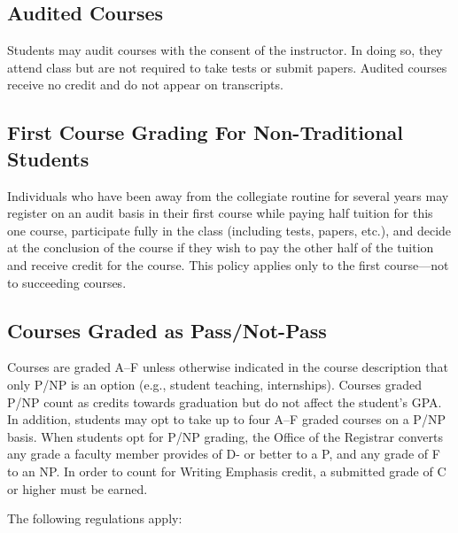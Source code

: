 \documentclass[
  letterpaper,
]{scrbook}
\begin{document}
\subsection{Audited Courses}\label{audited-courses}

Students may audit courses with the consent of the instructor. In doing
so, they attend class but are not required to take tests or submit
papers. Audited courses receive no credit and do not appear on
transcripts.

\subsection{First Course Grading For Non-Traditional
Students}\label{first-course-grading-for-non-traditional-students}

Individuals who have been away from the collegiate routine for several
years may register on an audit basis in their first course while paying
half tuition for this one course, participate fully in the class
(including tests, papers, etc.), and decide at the conclusion of the
course if they wish to pay the other half of the tuition and receive
credit for the course. This policy applies only to the first
course---not to succeeding courses.

\subsection{Courses Graded as
Pass/Not-Pass}\label{courses-graded-as-passnot-pass}

Courses are graded A--F unless otherwise indicated in the course
description that only P/NP is an option (e.g., student teaching,
internships). Courses graded P/NP count as credits towards graduation
but do not affect the student's GPA. In addition, students may opt to
take up to four A--F graded courses on a P/NP basis. When students opt
for P/NP grading, the Office of the Registrar converts any grade a
faculty member provides of D- or better to a P, and any grade of F to an
NP. In order to count for Writing Emphasis credit, a submitted grade of
C or higher must be earned.

The following regulations apply:
\end{document}
